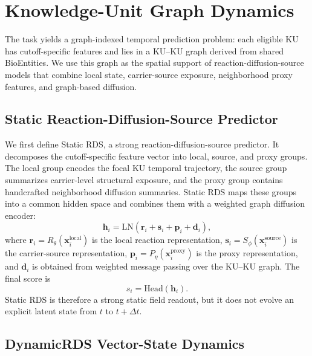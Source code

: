 \documentclass[conference]{IEEEtran}
\begin{document}
\section{Knowledge-Unit Graph Dynamics}

The task yields a graph-indexed temporal prediction problem: each eligible KU has cutoff-specific features and lies in a KU--KU graph derived from shared BioEntities. We use this graph as the spatial support of reaction-diffusion-source models that combine local state, carrier-source exposure, neighborhood proxy features, and graph-based diffusion.

\subsection{Static Reaction-Diffusion-Source Predictor}

We first define Static RDS, a strong reaction-diffusion-source predictor. It decomposes the cutoff-specific feature vector into local, source, and proxy groups. The local group encodes the focal KU temporal trajectory, the source group summarizes carrier-level structural exposure, and the proxy group contains handcrafted neighborhood diffusion summaries. Static RDS maps these groups into a common hidden space and combines them with a weighted graph diffusion encoder:
\begin{equation}
\mathbf{h}_i =
\mathrm{LN}\left(
\mathbf{r}_i + \mathbf{s}_i + \mathbf{p}_i + \mathbf{d}_i
\right),
\end{equation}
where $\mathbf{r}_i=R_\theta(\mathbf{x}_i^{\mathrm{local}})$ is the local reaction representation, $\mathbf{s}_i=S_\phi(\mathbf{x}_i^{\mathrm{source}})$ is the carrier-source representation, $\mathbf{p}_i=P_\eta(\mathbf{x}_i^{\mathrm{proxy}})$ is the proxy representation, and $\mathbf{d}_i$ is obtained from weighted message passing over the KU--KU graph. The final score is
\begin{equation}
s_i = \mathrm{Head}(\mathbf{h}_i).
\end{equation}
Static RDS is therefore a strong static field readout, but it does not evolve an explicit latent state from $t$ to $t+\Delta t$.

\subsection{DynamicRDS Vector-State Dynamics}
\end{document}
